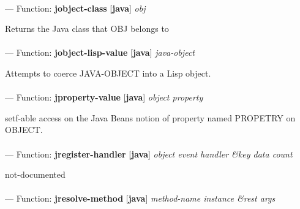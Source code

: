 \paragraph{}
\label{JAVA:JOBJECT-CLASS}
--- Function: \textbf{jobject-class} [\textbf{java}] \textit{obj}

\begin{adjustwidth}{5em}{5em}
Returns the Java class that OBJ belongs to
\end{adjustwidth}

\paragraph{}
\label{JAVA:JOBJECT-LISP-VALUE}
--- Function: \textbf{jobject-lisp-value} [\textbf{java}] \textit{java-object}

\begin{adjustwidth}{5em}{5em}
Attempts to coerce JAVA-OBJECT into a Lisp object.
\end{adjustwidth}

\paragraph{}
\label{JAVA:JPROPERTY-VALUE}
--- Function: \textbf{jproperty-value} [\textbf{java}] \textit{object property}

\begin{adjustwidth}{5em}{5em}
setf-able access on the Java Beans notion of property named PROPETRY on OBJECT.
\end{adjustwidth}

\paragraph{}
\label{JAVA:JREGISTER-HANDLER}
--- Function: \textbf{jregister-handler} [\textbf{java}] \textit{object event handler \&key data count}

\begin{adjustwidth}{5em}{5em}
not-documented
\end{adjustwidth}

\paragraph{}
\label{JAVA:JRESOLVE-METHOD}
--- Function: \textbf{jresolve-method} [\textbf{java}] \textit{method-name instance \&rest args}

